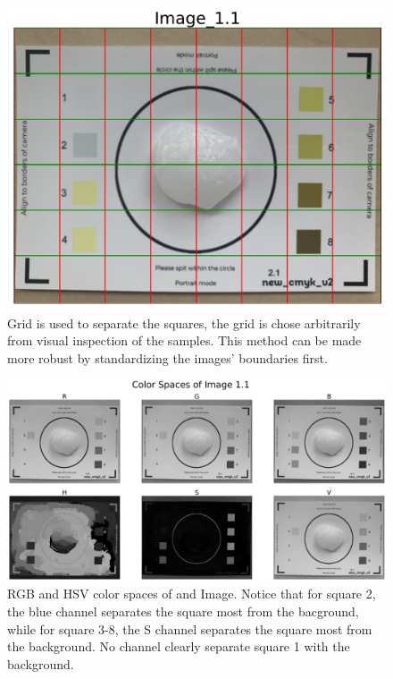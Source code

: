 \documentclass[12pt]{article}
\begin{document}
\newpage 
\begin{figure}[h]
    \centerline{\includegraphics[width=.85\textwidth]{figs/task2-grid.pdf}} 
	\caption{Grid is used to separate the squares, the grid is chose arbitrarily from visual inspection of the samples. This method can be made more robust by standardizing the images' boundaries first.}
	\label{fig: task2-grid}
\end{figure}

\begin{figure}[h]
    \centerline{\includegraphics[width=\textwidth]{figs/task2-color.pdf}} 
	\caption{RGB and HSV color spaces of and Image. Notice that for square 2, the blue channel separates the square most from the bacground, while for square 3-8, the S channel separates the square most from the background. No channel clearly separate square 1 with the background.}
	\label{fig: task2-color}
\end{figure}
\end{document}
